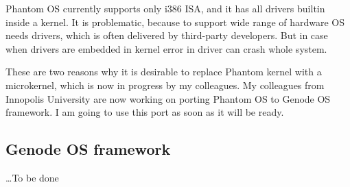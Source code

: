 Phantom OS currently supports only i386 ISA, and it has all drivers builtin 
inside a kernel. It is problematic, because to support wide range of hardware
OS needs drivers, which is often delivered by third-party developers. But in
case when drivers are embedded in kernel error in driver can crash whole system.

These are two reasons why it is desirable to replace Phantom kernel with a 
microkernel, which is now in progress by my colleagues. My colleagues from
Innopolis University are now working on porting Phantom OS to Genode OS 
framework. I am going to use this port as soon as it will be ready.

\subsection{Genode OS framework} 
\dots To be done
